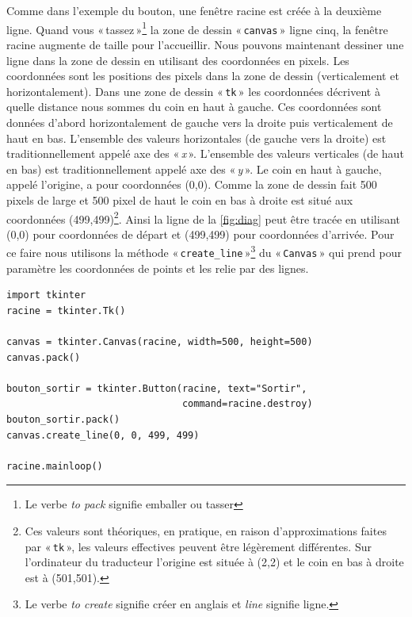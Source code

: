 Comme dans l'exemple du bouton, une fenêtre racine est créée à la deuxième ligne. Quand vous « tassez »\footnote{Le verbe \emph{to pack} signifie emballer ou tasser} la zone de dessin « \texttt{canvas} » ligne cinq, la fenêtre racine augmente de taille pour l'accueillir. Nous pouvons maintenant dessiner une ligne dans la zone de dessin en utilisant des coordonnées en pixels. Les coordonnées sont les positions des pixels dans la zone de dessin (verticalement et horizontalement). Dans une zone de dessin « \texttt{tk} »  les coordonnées décrivent à quelle distance nous sommes du coin en haut à gauche. Ces coordonnées sont données d'abord horizontalement de gauche vers la droite puis verticalement de haut en bas. L'ensemble des valeurs horizontales (de gauche vers la droite) est traditionnellement appelé axe des « \emph{x} ». L'ensemble des valeurs verticales (de haut en bas) est traditionnellement appelé axe des « \emph{y} ». Le coin en haut à gauche, appelé l'origine, a pour coordonnées (0,0). Comme la zone de dessin fait 500 pixels de large et 500 pixel de haut le coin en bas à droite est situé aux coordonnées (499,499)\footnote{Ces valeurs sont théoriques, en pratique, en raison d'approximations faites par « \texttt{tk} », les valeurs effectives peuvent être légèrement différentes. Sur l'ordinateur du traducteur l'origine est située à (2,2) et le coin en bas à droite est à (501,501).}. Ainsi la ligne de la \autoref{fig:diag} peut être tracée en utilisant (0,0) pour coordonnées de départ et (499,499) pour coordonnées d'arrivée. Pour ce faire nous utilisons la méthode « \texttt{create\_line} »\footnote{Le verbe \emph{to create} signifie créer en anglais et \emph{line} signifie ligne.} du « \texttt{Canvas} » qui prend pour paramètre les coordonnées de points et les relie par des lignes. 
\begin{Verbatim}[frame=single,rulecolor=\color{mbleu}, label=à taper]
import tkinter
racine = tkinter.Tk()

canvas = tkinter.Canvas(racine, width=500, height=500)
canvas.pack()

bouton_sortir = tkinter.Button(racine, text="Sortir",
                               command=racine.destroy)
bouton_sortir.pack()
canvas.create_line(0, 0, 499, 499)

racine.mainloop()
\end{Verbatim}

